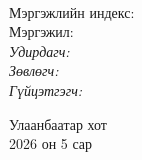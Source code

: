\begin{titlepage}
\begin{center}

{\scshape\LARGE \univname\par} %
{\scshape\Large \facname\par}\vspace{0.5cm} %

\vspace{2cm}
\hfill \large{\deptname} \\

\vspace{2cm}

{\huge \bfseries \ttitle\par}\vspace{0.4cm} %

\vspace{2cm}

\begin{minipage}[t] {0.9\textwidth}
\begin{flushleft} 
\normalsize

Мэргэжлийн индекс: \degreeid \\
Мэргэжил: \degreename \\[2cm]

\emph{Удирдагч:} {\supname} \\%
\emph{Зөвлөгч:} {\advicename} \\ %
\emph{Гүйцэтгэгч:} {\shortname} \\ %

\end{flushleft}
\end{minipage}

\vfill

\large {Улаанбаатар хот} \\
{\large 2026 он 5 сар}\\ %

\end{center}
\end{titlepage}

 